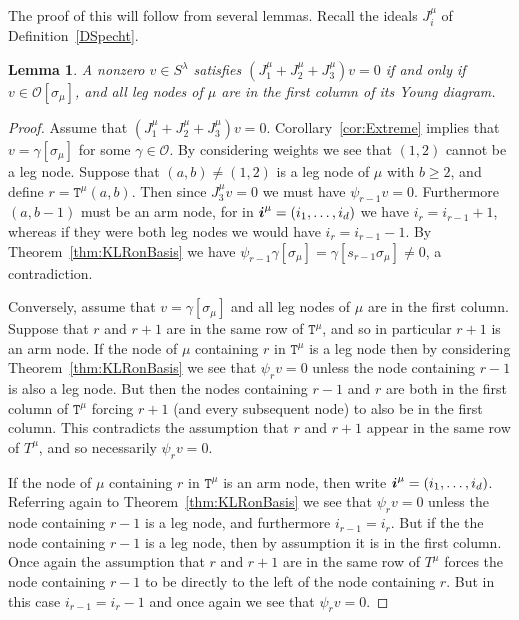 \documentclass[twoside,11pt,reqno,letter]{amsart}
\numberwithin{equation}{section}
\newtheorem{Lemma}[equation]{Lemma}
\theoremstyle{definition}  %
\def\bi{\text{\boldmath$i$}}
\newcommand{\0}{{\bar 0}}
\newcommand{\1}{{\bar 1}}
\newcommand{\ga}{\gamma}
\newcommand{\la}{\lambda}
\newcommand{\si}{\sigma}
\def\T{{\mathtt T}}
\renewcommand\O{\mathcal O}
\begin{document}
{The proof of this will follow from several lemmas.
Recall the ideals $J_i^\mu$ of Definition~\ref{DSpecht}.



\begin{Lemma}\label{lem:rel123}
  A nonzero $v \in S^\la$ satisfies $(J_1^\mu + J_2^\mu + J_3^\mu)v = 0$ if and only if
$v \in \O [\si_\mu]$, and
all leg nodes of $\mu$ are in the first column of its Young diagram.
\end{Lemma}

\begin{proof}
Assume that $(J_1^\mu + J_2^\mu + J_3^\mu)v = 0$. 
Corollary~\ref{cor:Extreme} implies that $v=\ga [\si_\mu]$ for some $\ga \in \O$. 
By considering weights we see that $(1,2)$ cannot be a leg node. Suppose that $(a, b) \neq (1,2)$ is a leg node of $\mu$ with $b \geq 2$, and define $r = \T^\mu(a,b)$. Then since $J_3^\mu v = 0$ we must have $\psi_{r-1} v = 0$.
Furthermore $(a, b-1)$ must be an arm node, for in $\bi^\mu=(i_1, \dots, i_d)$ we have $i_r = i_{r-1} + 1$, whereas if they were both leg nodes we would have $i_r = i_{r-1} - 1$. By Theorem~\ref{thm:KLRonBasis} we have $\psi_{r-1} \ga [\si_{\mu}] = \ga [s_{r-1} \si_{\mu}] \neq 0$, a contradiction.

Conversely, assume that $v=\ga [\si_\mu]$ and all leg nodes of $\mu$ are in the first column. Suppose that $r$ and $r+1$ are in the same row of $\T^\mu$, and so in particular $r+1$ is an arm node. If the node of $\mu$ containing $r$ in $\T^\mu$ is a leg node %
then by considering Theorem~\ref{thm:KLRonBasis} we see that $\psi_r v = 0$ unless the node containing $r-1$ is also a leg node. But then the nodes containing $r-1$ and $r$ are both in the first column of $\T^\mu$ forcing $r+1$ (and every subsequent node) to also be in the first column. This contradicts the assumption that $r$ and $r+1$ appear in the same row of $T^\mu$, and so necessarily $\psi_r v = 0$.
  
  If the node of $\mu$ containing $r$ in $\T^\mu$ is an arm node, then write $\bi^\mu = (i_1, \dots, i_d)$. Referring again to Theorem~\ref{thm:KLRonBasis} we see that $\psi_r v = 0$ unless the node containing $r-1$ is a leg node, and furthermore $i_{r-1} = i_r$. But if the the node containing $r-1$ is a leg node, then by assumption it is in the first column. Once again the assumption that $r$ and $r+1$ are in the same row of $T^\mu$ forces the node containing $r-1$ to be directly to the left of the node containing $r$. But in this case $i_{r-1} = i_r - 1$ and once again we see that $\psi_r v = 0$.
\end{proof}

}
\end{document}
